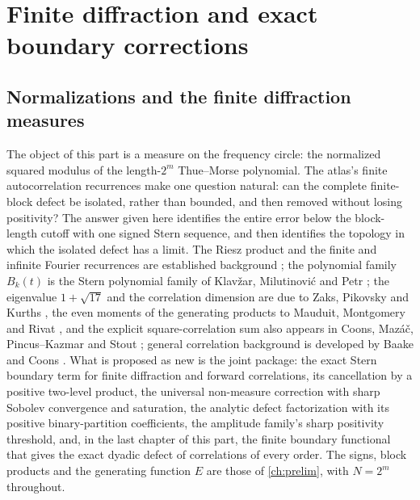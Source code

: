 \documentclass[11pt,a4paper,oneside,openany]{book}
\numberwithin{equation}{chapter}
\theoremstyle{definition}
\theoremstyle{remark}
\begin{document}

\part{Finite diffraction and exact boundary corrections}
\label{part:diffraction}

\chapter{Normalizations and the finite diffraction measures}
\label{bc:sec:setup}
The object of this part is a measure on the frequency circle: the
normalized squared modulus of the length-$2^m$ Thue--Morse polynomial. The
atlas's finite autocorrelation recurrences make one question natural: can
the complete finite-block defect be isolated, rather than bounded, and then
removed without losing positivity? The answer given here identifies the
entire error below the block-length cutoff with one signed Stern sequence,
and then identifies the topology in which the isolated defect has a limit.
The Riesz product and the finite and infinite Fourier recurrences are
established background \cite{baake-grimm}; the polynomial family $B_k(t)$ is
the Stern polynomial family of Klav\v zar, Milutinovi\'c and Petr
\cite{klavzar-stern}; the eigenvalue $1+\sqrt{17}$ and the correlation
dimension are due to Zaks, Pikovsky and Kurths \cite{zaks}, the even
moments of the generating products to Mauduit, Montgomery and Rivat
\cite{mmr}, and the explicit square-correlation sum also appears in Coons,
Maz\'a\v c, Pincus--Kazmar and Stout \cite{cmps}; general correlation
background is developed by Baake and Coons \cite{baake-coons}. What is
proposed as new is the joint package: the exact Stern boundary term for
finite diffraction and forward correlations, its cancellation by a positive
two-level product, the universal non-measure correction with sharp Sobolev
convergence and saturation, the analytic defect factorization with its
positive binary-partition coefficients, the amplitude family's sharp
positivity threshold, and, in the last chapter of this part, the finite
boundary functional that gives the exact dyadic defect of correlations of
every order. The signs, block products and the generating function $E$ are
those of \cref{ch:prelim}, with $N=2^m$ throughout.


\end{document}
